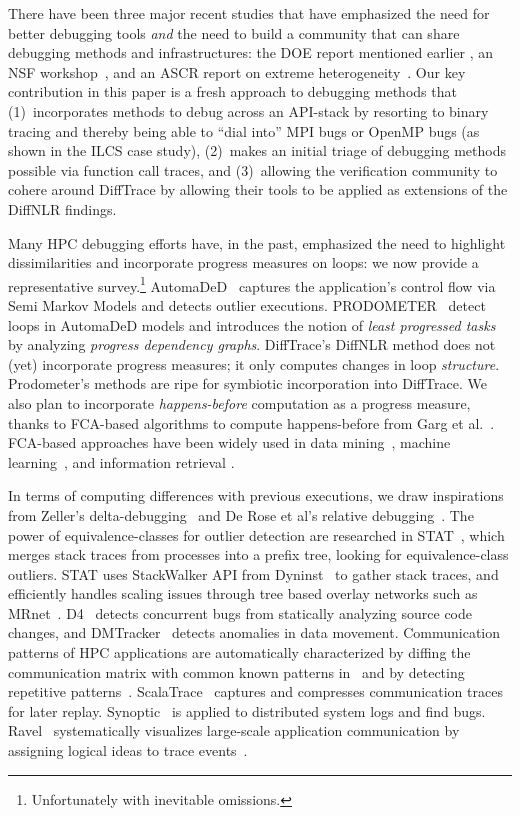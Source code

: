 There have been three major recent studies
that have emphasized the need for better debugging tools
{\em and} the need to build a community that can share debugging
methods and infrastructures: the DOE report mentioned
earlier \cite{hpcdoe},
an NSF workshop~\cite{Cohen:2018:IRC:3297279}, and an ASCR report on
extreme heterogeneity~\cite{ascr-report-extreme-heterogeneity}.
%
Our key contribution in this paper is a fresh approach to debugging
methods that (1)~incorporates methods to debug across an API-stack
by resorting to binary tracing and thereby being able to ``dial into''
MPI bugs or OpenMP bugs (as shown in the ILCS case study), (2)~makes
an initial triage of debugging methods possible via function call traces,
and (3)~allowing the verification community to cohere around DiffTrace
by allowing their tools to be applied as extensions of the DiffNLR
findings.


Many HPC debugging efforts have, in the past, emphasized
the need to highlight dissimilarities and
incorporate progress measures on loops: we now
provide a representative survey.\footnote{Unfortunately with inevitable omissions.}
%
AutomaDeD~\cite{automaded-GBron}\cite{automaded-laguna}
captures the application's control flow
via Semi Markov Models and detects outlier executions.
%
PRODOMETER~\cite{prodometer} detect loops in
AutomaDeD models and introduces the
notion of {\em least progressed tasks} by analyzing {\em progress dependency graphs}.
%
DiffTrace's DiffNLR method does not (yet) incorporate progress measures; it only
computes changes in loop {\em structure}.
%
Prodometer's methods are ripe for symbiotic incorporation into DiffTrace.
%
We also plan to incorporate {\em happens-before} computation as a progress measure,
thanks to FCA-based algorithms
to compute happens-before from Garg et al.~\cite{latticeForDistConst,garg_2015}.
%
FCA-based approaches have been widely used  in data mining~\cite{cldm},
machine learning~\cite{clml}, and information retrieval \cite{ignatov17}.


In terms of computing differences with previous executions,
we draw inspirations from
Zeller's delta-debugging~\cite{DBLP:conf/esec/Zeller99}
and De Rose et al's relative debugging~\cite{relative-debugging}.
%
The power of equivalence-classes for outlier detection are
researched in STAT~\cite{stat}, which
merges stack traces from processes into a prefix tree,
looking for equivalence-class outliers.
%
STAT uses StackWalker API from Dyninst~\cite{dyninst} to gather stack traces,
and efficiently handles scaling issues
through tree based overlay networks such as MRnet~\cite{mrnet}.
%
D4~\cite{liu-18} detects concurrent bugs from statically analyzing source code
changes, and DMTracker~\cite{dmtracker} detects anomalies in data movement.
%
Communication patterns of HPC applications are automatically characterized by
diffing the communication matrix with common known patterns in~\cite{roth-15} and by
detecting repetitive patterns~\cite{preissl-08}.
%
ScalaTrace~\cite{scalatrace} captures and compresses communication traces for later replay. 
%
Synoptic~\cite{beschastnikh-synoptic} is applied to distributed
system logs and find bugs.
%
Ravel~\cite{ravel} systematically visualizes
large-scale application communication by assigning logical ideas to trace events~\cite{charmVis}. 

